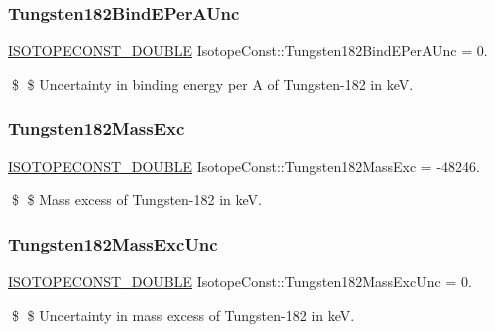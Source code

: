 \subsubsection{\texorpdfstring{Tungsten182\+Bind\+E\+Per\+A\+Unc}{Tungsten182BindEPerAUnc}}
{\footnotesize\ttfamily \mbox{\hyperlink{group___isotope_const-_macros_ga8f45a7272ce02c0b4c65c44636ed719a}{I\+S\+O\+T\+O\+P\+E\+C\+O\+N\+S\+T\+\_\+\+D\+O\+U\+B\+LE}} Isotope\+Const\+::\+Tungsten182\+Bind\+E\+Per\+A\+Unc = 0.}

\$ \$ Uncertainty in binding energy per A of Tungsten-\/182 in keV. \mbox{\label{group___isotope_const-_tungsten-_w182_ga0e8343740f0d47f4fba0db1630ce6343}} 
\subsubsection{\texorpdfstring{Tungsten182\+Mass\+Exc}{Tungsten182MassExc}}
{\footnotesize\ttfamily \mbox{\hyperlink{group___isotope_const-_macros_ga8f45a7272ce02c0b4c65c44636ed719a}{I\+S\+O\+T\+O\+P\+E\+C\+O\+N\+S\+T\+\_\+\+D\+O\+U\+B\+LE}} Isotope\+Const\+::\+Tungsten182\+Mass\+Exc = -\/48246.}

\$ \$ Mass excess of Tungsten-\/182 in keV. \mbox{\label{group___isotope_const-_tungsten-_w182_ga05d6f7e8985f03bf2cb6f5f242d294d9}} 
\subsubsection{\texorpdfstring{Tungsten182\+Mass\+Exc\+Unc}{Tungsten182MassExcUnc}}
{\footnotesize\ttfamily \mbox{\hyperlink{group___isotope_const-_macros_ga8f45a7272ce02c0b4c65c44636ed719a}{I\+S\+O\+T\+O\+P\+E\+C\+O\+N\+S\+T\+\_\+\+D\+O\+U\+B\+LE}} Isotope\+Const\+::\+Tungsten182\+Mass\+Exc\+Unc = 0.}

\$ \$ Uncertainty in mass excess of Tungsten-\/182 in keV. \mbox{\label{group___isotope_const-_tungsten-_w182_ga2fef17a51e4d9626e6d1497369a9e74c}} 

